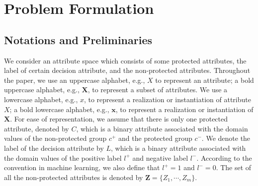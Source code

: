 \documentclass{article}
\begin{document}
\begin{comment}
In this paper, we target the pre-process methods and tackle the limitation that there is no guarantee about the discrimination in prediction. Based on whether the methods can ensure non-discrimination in prediction using our two-phase framework, existing pre-process methods can be categorized as the methods that only modify the label, such as the \emph{Massaging} \cite{kamiran2009classifying,zliobaite2011handling} and the \emph{Causal-Based Removal} \cite{zhang2017causal}, and the methods that modify the data attributes other than the label, such as the \emph{Preferential Sampling} \cite{kamiran2012data,zliobaite2011handling}, the \emph{Reweighing} \cite{calders2009building}, and the \emph{Disparate Impact Removal} \cite{feldman2015certifying,adler2016auditing}. Our results show that only the first category can guarantee non-discrimination in prediction.
\end{comment}




\section{Problem Formulation}

\subsection{Notations and Preliminaries}
We consider an attribute space which consists of some protected attributes, the label of certain decision attribute, and the non-protected attributes. Throughout the paper, we use an uppercase alphabet, e.g., $X$ to represent an attribute; a bold uppercase alphabet, e.g., $\mathbf{X}$, to represent a subset of attributes. We use a lowercase alphabet, e.g., $x$, to represent a realization or instantiation of attribute $X$; a bold lowercase alphabet, e.g., $\mathbf{x}$, to represent a realization or instantiation of $\mathbf{X}$. For ease of representation, we assume that there is only one protected attribute, denoted by $C$, which is a binary attribute associated with the domain values of the non-protected group $c^{+}$ and the protected group $c^{-}$. We denote the label of the decision attribute by $L$, which is a binary attribute associated with the domain values of the positive label $l^{+}$ and negative label $l^{-}$. According to the convention in machine learning, we also define that $l^{+}=1$ and $l^{-}=0$. The set of all the non-protected attributes is denoted by $\mathbf{Z}=\{Z_{1},\cdots,Z_{m}\}$. %
\end{document}
